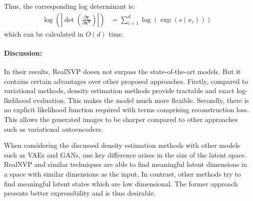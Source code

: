 \documentclass[runningheads]{llncs}
\begin{document}
Thus, the corresponding log determinant is:
\begin{align*}
\log\left( \left|\det(\frac{\partial \mathbf{y}}{\partial \mathbf{x^T}})\right|\right) &= \sum_{i=1}^{d}{\log(\exp(s(x_i)))}
\end{align*}
which can be calculated in $O(d)$ time.

\paragraph{Discussion:}
In their results, RealNVP doesn not surpass the state-of-the-art models. But it contains certain advantages over other proposed approaches. Firstly, compared to variational methods, density estimation methods provide tractable and exact log-lkelihood evaluation. This makes the model much more flexible. Secondly, there is no explicit likelihood function required with terms comprising reconstruction loss. This allows the generated images to be sharper compared to other approaches such as variational autoencoders.

When considering the discussed density estimation methods with other models such as VAEs and GANs, one key difference arises in the size of the latent space. RealNVP and similar techniques are able to find meaningful latent dimensions in a space with similar dimensions as the input. In contrast, other methods try to find meaningful latent states which are low dimensional. The former approach presents better expressibility and is thus desirable.
\end{document}
